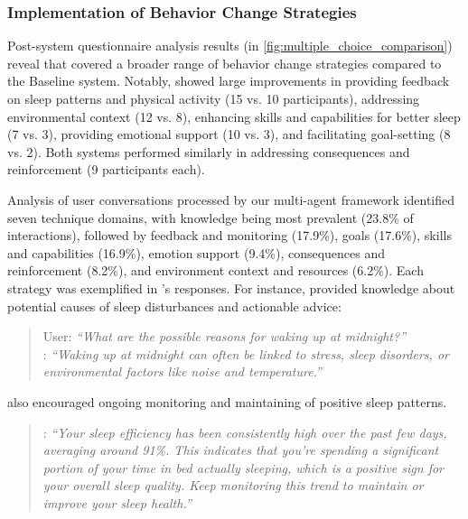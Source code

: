 \subsubsection{Implementation of Behavior Change Strategies}
Post-system questionnaire analysis results (in \autoref{fig:multiple_choice_comparison}) reveal that \name{} covered a broader range of behavior change strategies compared to the Baseline system. Notably, \name{} showed large improvements in providing feedback on sleep patterns and physical activity (15 vs. 10 participants), addressing environmental context (12 vs. 8), enhancing skills and capabilities for better sleep (7 vs. 3), providing emotional support (10 vs. 3), and facilitating goal-setting (8 vs. 2). 
Both systems performed similarly in addressing consequences and reinforcement (9 participants each).

Analysis of user conversations processed by our multi-agent framework identified seven technique domains, with knowledge being most prevalent (23.8\% of interactions), followed by feedback and monitoring (17.9\%), goals (17.6\%), skills and capabilities (16.9\%), emotion support (9.4\%), consequences and reinforcement (8.2\%), and environment context and resources (6.2\%).
Each strategy was exemplified in \name{}'s responses. For instance, \name{} provided knowledge about potential causes of sleep disturbances and actionable advice:
\begin{quote}
User: \textit{``What are the possible reasons for waking up at midnight?''}\\
\name{}: \textit{``Waking up at midnight can often be linked to stress, sleep disorders, or environmental factors like noise and temperature.''}
\end{quote}

\name{} also encouraged ongoing monitoring and maintaining of positive sleep patterns.
\begin{quote}
\name{}: \textit{``Your sleep efficiency has been consistently high over the past few days, averaging around 91\%. This indicates that you're spending a significant portion of your time in bed actually sleeping, which is a positive sign for your overall sleep quality. Keep monitoring this trend to maintain or improve your sleep health.''}
\end{quote}

